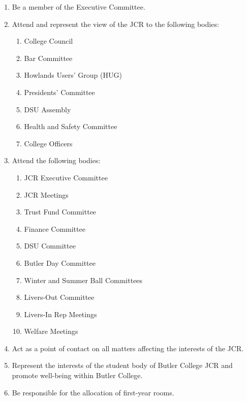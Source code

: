 \renewcommand{\thesection}{\textbf{R\arabic{section}}}

\SectionTitle{\thesection}{President}
\begin{enumerate}
    \item Be a member of the Executive Committee.
        \item Attend and represent the view of the JCR to the following bodies:
        \begin{enumerate}
            \item College Council
            \item Bar Committee
            \item Howlands Users’ Group (HUG) 
            \item Presidents’ Committee 
            \item DSU Assembly
            \item Health and Safety Committee 
            \item College Officers
        \end{enumerate}
        \item Attend the following bodies:
        \begin{enumerate}
            \item JCR Executive Committee
            \item JCR Meetings
            \item Trust Fund Committee
            \item Finance Committee
            \item DSU Committee
            \item Butler Day Committee
            \item Winter and Summer Ball Committees 
            \item Livers-Out Committee
            \item Livers-In Rep Meetings
            \item Welfare Meetings
        \end{enumerate}
        \item Act as a point of contact on all matters affecting the interests of the JCR.
        \item Represent the interests of the student body of Butler College JCR and promote well-being within Butler College.
        \item Be responsible for the allocation of first-year rooms.

\end{enumerate}
